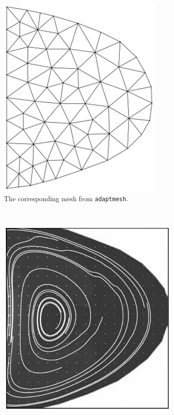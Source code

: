 \documentclass[11pt]{article}
\begin{document}
\begin{figure}[htbp]
\begin{subfigure}[b]{0.3\textwidth}
    \includegraphics[width=0.9\textwidth]{./esimerkki_2.png}
    \caption{The corresponding mesh from \texttt{adaptmesh}.}
    \label{fig:photomesh}
  \end{subfigure}
  \\
  \begin{subfigure}[b]{0.3\textwidth}
    \centering
    \includegraphics[width=\textwidth]{./esimerkki_3.png}

\end{subfigure}
\end{figure}
\end{document}
